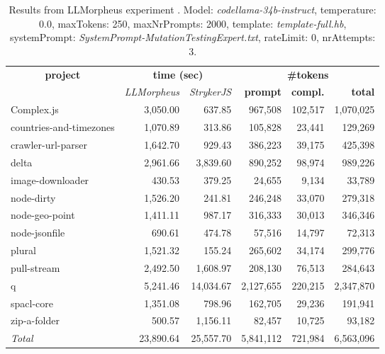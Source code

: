 
\begin{table*}[hbt!]
\centering
{\scriptsize
\begin{tabular}{l||r|r|r|r|r}
\multicolumn{1}{c|}{\bf project} & \multicolumn{2}{|c|}{\bf time (sec)} & \multicolumn{3}{|c|}{\bf \#tokens} \\
               & {\it LLMorpheus} & {\it StrykerJS} & {\bf prompt} & {\bf compl.} & {\bf total} \\
\hline
  Complex.js & 3,050.00 & 637.85 & 967,508 & 102,517 & 1,070,025 \\ 
countries-and-timezones & 1,070.89 & 313.86 & 105,828 & 23,441 & 129,269 \\ 
crawler-url-parser & 1,642.70 & 929.43 & 386,223 & 39,175 & 425,398 \\ 
delta & 2,961.66 & 3,839.60 & 890,252 & 98,974 & 989,226 \\ 
image-downloader & 430.53 & 379.25 & 24,655 & 9,134 & 33,789 \\ 
node-dirty & 1,526.20 & 241.81 & 246,248 & 33,070 & 279,318 \\ 
node-geo-point & 1,411.11 & 987.17 & 316,333 & 30,013 & 346,346 \\ 
node-jsonfile & 690.61 & 474.78 & 57,516 & 14,797 & 72,313 \\ 
plural & 1,521.32 & 155.24 & 265,602 & 34,174 & 299,776 \\ 
pull-stream & 2,492.50 & 1,608.97 & 208,130 & 76,513 & 284,643 \\ 
q & 5,241.46 & 14,034.67 & 2,127,655 & 220,215 & 2,347,870 \\ 
spacl-core & 1,351.08 & 798.96 & 162,705 & 29,236 & 191,941 \\ 
zip-a-folder & 500.57 & 1,156.11 & 82,457 & 10,725 & 93,182 \\ 
\hline
  \textit{Total} & 23,890.64 & 25,557.70 & 5,841,112 & 721,984 & 6,563,096 \\
  \end{tabular}
  }
  \\[2mm]
  \caption{Results from LLMorpheus experiment .
    Model: \textit{codellama-34b-instruct}, 
    temperature: 0.0, 
    maxTokens: 250, 
    maxNrPrompts: 2000, 
    template: \textit{template-full.hb}, 
    systemPrompt: \textit{SystemPrompt-MutationTestingExpert.txt}, 
    rateLimit: 0, 
    nrAttempts: 3.  
  }
  \label{table:Cost:run312:codellama-34b-instruct:template-full.hb:0.0}
\end{table*}